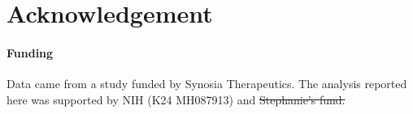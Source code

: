 \section*{Acknowledgement}

\paragraph{Funding\textcolon} Data came from a study funded by Synosia Therapeutics. The analysis reported here was supported by NIH (K24 MH087913) and \sout{Stephanie's fund.}
